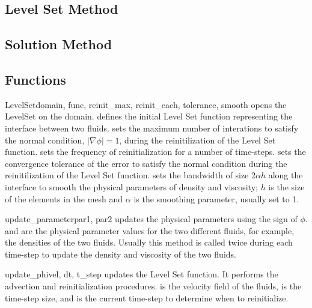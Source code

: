 \subsection{Level Set Method}

\subsection{Solution Method}

\subsection{Functions}

\begin{classdesc}{LevelSet}{domain, func, reinit\_max, reinit\_each, tolerance, smooth}
opens the LevelSet  on the \Domain domain.  defines the initial Level Set function representing the interface between two fluids.  sets the maximum number of interations to satisfy the normal condition, $|\nabla \phi|=1$, during the reinitilization of the Level Set function.  sets the frequency of reinitialization for a number of time-steps.  sets the convergence tolerance of the error to satisfy the normal condition during the reinitilization of the Level Set function.  sets the bandwidth of size 2$\alpha h$ along the interface to smooth the physical parameters of density and viscosity; $h$ is the size of the elements in the mesh and $\alpha$ is the smoothing parameter, usually set to 1.
\end{classdesc}

\begin{methoddesc}[LevelSet]{update\_parameter}{par1, par2}
updates the physical parameters using the sign of $\phi$.  and  are the physical parameter values for the two different fluids, for example, the densities of the two fluids. Usually this method is called twice during each time-step to update the density and viscosity of the two fluids.
\end{methoddesc}

\begin{methoddesc}[LevelSet]{update\_phi}{vel,  dt, t\_step}
updates the Level Set function. It performs the advection and reinitialization procedures.  is the velocity field of the fluids,  is the time-step size, and  is the current time-step to determine when to reinitialize.
\end{methoddesc}



